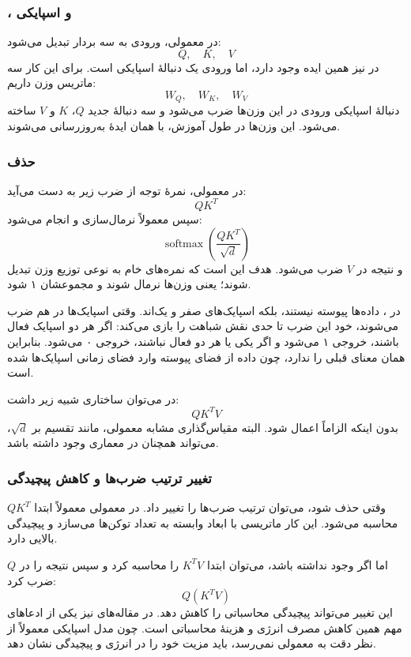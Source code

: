 \subsubsection{،  و  اسپایکی}
در  معمولی،  ورودی به سه بردار تبدیل می‌شود:
\[
Q,\quad K,\quad V
\]
در  نیز همین ایده وجود دارد، اما ورودی یک دنبالهٔ اسپایکی است. برای این کار سه ماتریس وزن داریم:
\[
W_Q,\quad W_K,\quad W_V
\]
دنبالهٔ اسپایکی ورودی در این وزن‌ها ضرب می‌شود و سه دنبالهٔ جدید \(Q\)، \(K\) و \(V\) ساخته می‌شود. این وزن‌ها در طول آموزش، با همان ایدهٔ  به‌روزرسانی می‌شوند.

\subsubsection{حذف }
در  معمولی، نمرهٔ توجه از ضرب زیر به دست می‌آید:
\[
QK^T
\]
سپس معمولاً نرمال‌سازی و  انجام می‌شود:
\[
\operatorname{softmax}\left(\frac{QK^T}{\sqrt{d}}\right)
\]
و نتیجه در \(V\) ضرب می‌شود. هدف  این است که نمره‌های خام به نوعی توزیع وزن تبدیل شوند؛ یعنی وزن‌ها نرمال شوند و مجموعشان ۱ شود.

در ، داده‌ها پیوسته نیستند، بلکه اسپایک‌های صفر و یک‌اند. وقتی اسپایک‌ها در هم ضرب می‌شوند، خود این ضرب تا حدی نقش شباهت را بازی می‌کند: اگر هر دو اسپایک فعال باشند، خروجی ۱ می‌شود و اگر یکی یا هر دو فعال نباشند، خروجی ۰ می‌شود. بنابراین  همان معنای قبلی را ندارد، چون داده از فضای پیوسته وارد فضای زمانی اسپایک‌ها شده است.

در  می‌توان ساختاری شبیه زیر داشت:
\[
QK^TV
\]
بدون اینکه الزاماً  اعمال شود. البته مقیاس‌گذاری مشابه  معمولی، مانند تقسیم بر \(\sqrt{d}\)، می‌تواند همچنان در معماری وجود داشته باشد.

\subsubsection{تغییر ترتیب ضرب‌ها و کاهش پیچیدگی}
وقتی  حذف شود، می‌توان ترتیب ضرب‌ها را تغییر داد. در  معمولی معمولاً ابتدا \(QK^T\) محاسبه می‌شود. این کار ماتریسی با ابعاد وابسته به تعداد توکن‌ها می‌سازد و پیچیدگی بالایی دارد.

اما اگر  وجود نداشته باشد، می‌توان ابتدا \(K^TV\) را محاسبه کرد و سپس نتیجه را در \(Q\) ضرب کرد:
\[
Q(K^TV)
\]
این تغییر می‌تواند پیچیدگی محاسباتی را کاهش دهد. در مقاله‌های  نیز یکی از ادعاهای مهم همین کاهش مصرف انرژی و هزینهٔ محاسباتی است. چون مدل اسپایکی معمولاً از نظر دقت به  معمولی نمی‌رسد، باید مزیت خود را در انرژی و پیچیدگی نشان دهد.

